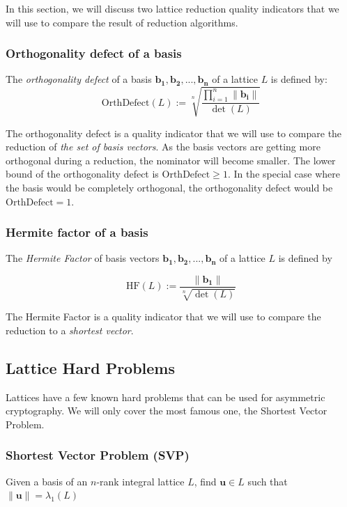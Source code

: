 \documentclass[10pt, a4paper]{article}
\renewcommand{\vec}[1]{\mathbf{#1}}
\begin{document}
In this section, we will discuss two lattice reduction quality indicators that we will use to compare the result of reduction algorithms.

\subsubsection{Orthogonality defect of a basis}
\label{sec:orthogonalityDefect}
The \emph{orthogonality defect} of a basis $\vec{b_1},\vec{b_2},...,\vec{b_n}$ of a lattice $L$ is defined by:
\[
    \text{OrthDefect}(L) :=  \sqrt[n]{\frac{\displaystyle\prod^{n}_{i=1} \|\vec{b_i}\| }{\det(L)}}
\]

The orthogonality defect is a quality indicator that we will use to compare the reduction of \emph{the set of basis vectors}. As the basis vectors are getting more orthogonal during a reduction, the nominator will become smaller. The lower bound of the orthogonality defect is $\text{OrthDefect} \ge 1$. In the special case where the basis would be completely orthogonal, the orthogonality defect would be $\text{OrthDefect} = 1$.

\subsubsection{Hermite factor of a basis}
\label{sec:hermiteFactor}
The \emph{Hermite Factor} of basis vectors $\vec{b_1}, \vec{b_2},...,\vec{b_n}$ of a lattice $L$ is defined by

\[
    \text{HF}(L) := \frac{\|\vec{b_1}\|}{\sqrt[n]{\det(L)}}
\]

The Hermite Factor is a quality indicator that we will use to compare the reduction to a \emph{shortest vector}.

\subsection{Lattice Hard Problems}

Lattices have a few known hard problems that can be used for asymmetric cryptography. We will only cover the most famous one, the Shortest Vector Problem.

\subsubsection{Shortest Vector Problem (SVP)}

Given a basis of an $n$-rank integral lattice $L$, find $\vec{u} \in L$ such that $\|\vec{u}\| = \lambda_1 (L)$
\end{document}
